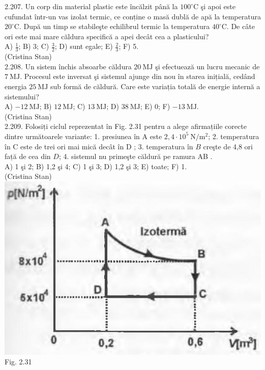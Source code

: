 \documentclass[10pt]{article}
\begin{document}
2.207. Un corp din material plastic este încălzit până la $100^{\circ} \mathrm{C}$ şi apoi este cufundat într-un vas izolat termic, ce conține o masă dublă de apă la temperatura $20^{\circ} \mathrm{C}$. După un timp se stabileşte echilibrul termic la temperatura $40^{\circ} \mathrm{C}$. De câte ori este mai mare căldura specifică a apei decât cea a plasticului?\\ A) $\frac{1}{3}$; B) 3; C) $\frac{3}{2}$; D) sunt egale; E) $\frac{2}{3}$; F) 5.\\ (Cristina Stan)\\

2.208. Un sistem închis absoarbe căldura $20 \mathrm{~MJ}$ şi efectuează un lucru mecanic de $7 \mathrm{~MJ}$. Procesul este inversat şi sistemul ajunge din nou în starea inițială, cedând energia $25 \mathrm{~MJ}$ sub formă de căldură. Care este variația totală de energie internă a sistemului?\\ A) $-12 \mathrm{~MJ}$; B) $12 \mathrm{~MJ}$; C) $13 \mathrm{~MJ}$; D) $38 \mathrm{~MJ}$; E) 0; F) $-13 \mathrm{~MJ}$.\\ (Cristina Stan)\\

2.209. Folosiți ciclul reprezentat în Fig. 2.31 pentru a alege afirmațiile corecte dintre următoarele variante: 1. presiunea în A este $2,4 \cdot 10^{5} \mathrm{~N} / \mathrm{m}^{2}$; 2. temperatura în C este de trei ori mai mică decât în D ; 3. temperatura în $B$ creşte de 4,8 ori față de cea din $D$; 4. sistemul nu primeşte căldură pe ramura AB .\\ A) 1 şi 2; B) 1,2 şi 4; C) 1 şi 3; D) 1,2 şi 3; E) toate; F) 1.\\ (Cristina Stan)\\ \includegraphics[max width=\textwidth, center]{2025_07_01_5b3ff9fa0d508c8e9f17g-121} Fig. 2.31\\
\end{document}
